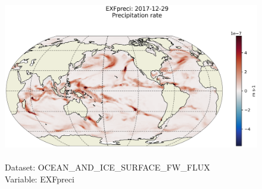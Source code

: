 \begin{figure}[H]
\centering
\includegraphics[scale=0.5]{../images/plots/latlon_plots/Ocean_and_Sea-Ice_Surface_Freshwater_Fluxes/EXFpreci.png}
\caption{\\Dataset: OCEAN\_AND\_ICE\_SURFACE\_FW\_FLUX\\Variable: EXFpreci}
\label{tab:table-OCEAN_AND_ICE_SURFACE_FW_FLUX_EXFpreci-Plot}
\end{figure}
\pagebreak
